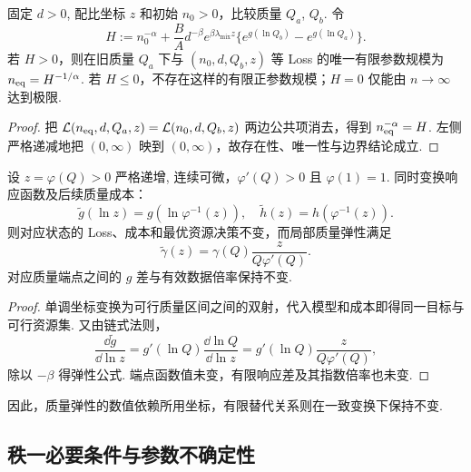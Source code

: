 \begin{proposition}[有限质量提升的等效参数规模]\label{prop:q2-finite-substitution-v15}
固定 $d>0$, 配比坐标 $z$ 和初始 $n_0>0$，比较质量 $Q_a$, $Q_b$. 令
\[
H:=n_0^{-\alpha}+\frac BA d^{-\beta}e^{\beta\lambda_{\mathrm{mix}}z}
\{e^{g(\ln Q_b)}-e^{g(\ln Q_a)}\}.
\]
若 $H>0$，则在旧质量 $Q_a$ 下与 $(n_0,d,Q_b,z)$ 等 Loss 的唯一有限参数规模为 $n_{\rm eq}=H^{-1/\alpha}$. 若 $H\le0$，不存在这样的有限正参数规模；$H=0$ 仅能由 $n\to\infty$ 达到极限. 
\end{proposition}
\begin{proof}
把 $\mathcal L(n_{\rm eq},d,Q_a,z)=\mathcal L(n_0,d,Q_b,z)$ 两边公共项消去，得到 $n_{\rm eq}^{-\alpha}=H$. 左侧严格递减地把 $(0,\infty)$ 映到 $(0,\infty)$，故存在性、唯一性与边界结论成立. 
\end{proof}

\begin{proposition}[质量坐标变换与有限响应不变性]\label{prop:q2-quality-coordinate-v37}
设 $z=\varphi(Q)>0$ 严格递增, 连续可微，$\varphi'(Q)>0$ 且 $\varphi(1)=1$. 同时变换响应函数及后续质量成本：
\[
\widetilde g(\ln z)=g(\ln\varphi^{-1}(z)),\quad
\widetilde h(z)=h(\varphi^{-1}(z)).
\]
则对应状态的 Loss、成本和最优资源决策不变，而局部质量弹性满足
\begin{equation}\label{eq:q2-coordinate-elasticity-v37}
\widetilde\gamma(z)=\gamma(Q)\frac{z}{Q\varphi'(Q)}.
\end{equation}
对应质量端点之间的 $g$ 差与有效数据倍率保持不变. 
\end{proposition}
\begin{proof}
单调坐标变换为可行质量区间之间的双射，代入模型和成本即得同一目标与可行资源集. 又由链式法则，
\[
\frac{\dd\widetilde g}{\dd\ln z}
=g'(\ln Q)\frac{\dd\ln Q}{\dd\ln z}
=g'(\ln Q)\frac{z}{Q\varphi'(Q)},
\]
除以 $-\beta$ 得弹性公式. 端点函数值未变，有限响应差及其指数倍率也未变. 
\end{proof}
因此，质量弹性的数值依赖所用坐标，有限替代关系则在一致变换下保持不变. %

\subsection{秩一必要条件与参数不确定性}

